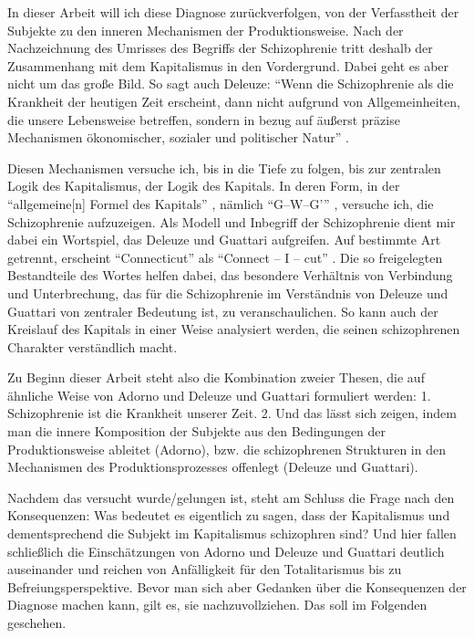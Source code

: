 \documentclass[12pt,
               DIV13,
               paper=a4,
               twoside=false,
               onehalfspacing,
               bibliography=totoc,
               toc=graduated,
               draft,
               ]{scrartcl}
\newcommand{\pc}[2]{\parencite[#1]{#2}}
\newcommand{\dg}{Deleuze und Guattari\xspace}
\begin{document}
In dieser Arbeit will ich diese Diagnose zurückverfolgen, von der
Verfasstheit der Subjekte zu den inneren Mechanismen der
Produktionsweise. Nach der Nachzeichnung des Umrisses des Begriffs der
Schizophrenie tritt deshalb der Zusammenhang mit dem Kapitalismus in
den Vordergrund. Dabei geht es aber nicht um das große Bild. So sagt
auch Deleuze: "`Wenn die Schizophrenie
als die Krankheit der heutigen Zeit erscheint, dann nicht aufgrund von
Allgemeinheiten, die unsere Lebensweise betreffen, sondern in bezug
auf äußerst präzise Mechanismen ökonomischer, sozialer und politischer
Natur"' \pc{28}{schizg}.

Diesen Mechanismen versuche ich, bis in die Tiefe zu folgen, bis zur
zentralen Logik des Kapitalismus, der Logik des Kapitals. In deren
Form, in der "`allgemeine[n] Formel des Kapitals"' \pc{161}{kap},
nämlich "`G--W--G'"' \pc{165}{kap}, versuche ich, die Schizophrenie
aufzuzeigen. Als Modell und Inbegriff der Schizophrenie dient mir
dabei ein Wortspiel, das \dg aufgreifen. Auf bestimmte Art getrennt,
erscheint "`Connecticut"' als "`Connect -- I -- cut"' \pc{48}{ao}. Die so
freigelegten Bestandteile des Wortes helfen dabei, das besondere
Verhältnis von Verbindung und Unterbrechung, das für die Schizophrenie
im Verständnis von \dg von zentraler Bedeutung ist, zu
veranschaulichen. So kann auch der Kreislauf des Kapitals in einer
Weise analysiert werden, die seinen schizophrenen Charakter
verständlich macht.

Zu Beginn dieser Arbeit steht also die Kombination zweier Thesen, die
auf ähnliche Weise von Adorno und \dg formuliert werden: 1.
Schizophrenie ist die Krankheit unserer Zeit. 2. Und das lässt sich
zeigen, indem man die innere Komposition der Subjekte aus den
Bedingungen der Produktionsweise ableitet (Adorno), bzw. die
schizophrenen Strukturen in den Mechanismen des Produktionsprozesses
offenlegt (\dg).

Nachdem das versucht wurde/gelungen ist, steht am Schluss die Frage
nach den Konsequenzen: Was bedeutet es eigentlich zu sagen, dass der
Kapitalismus und dementsprechend die Subjekt im Kapitalismus
schizophren sind? Und hier fallen schließlich die Einschätzungen von
Adorno und \dg deutlich auseinander und reichen von \glq Anfälligkeit
für den Totalitarismus\grq{} bis zu \glq Befreiungsperspektive\grq{}.
Bevor man  sich aber Gedanken über die Konsequenzen der Diagnose
machen kann, gilt es, sie nachzuvollziehen. Das soll im Folgenden
geschehen.

\end{document}
